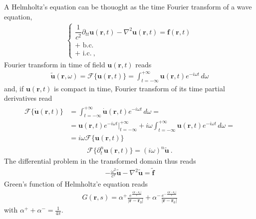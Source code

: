 \documentclass[letterpaper,10pt,italian]{jupyterBook}
\begin{document}
\sphinxAtStartPar
A Helmholtz’s equation can be thouoght as the time Fourier transform of a wave equation,
\begin{equation*}
\begin{split}\begin{cases}
  \dfrac{1}{c^2} \partial_{tt} \mathbf{u}(\mathbf{r},t) - \nabla^2 \mathbf{u}(\mathbf{r},t) = \mathbf{f}(\mathbf{r},t) \\
  \text{+ b.c.} \\
  \text{+ i.c.} \ ,
\end{cases}\end{split}
\end{equation*}
\sphinxAtStartPar
Fourier transform in time of field \(\mathbf{u}(\mathbf{r},t)\) reads
\begin{equation*}
\begin{split}\tilde{\mathbf{u}}(\mathbf{r}, \omega) = \mathscr{F}\{ \mathbf{u}(\mathbf{r},t) \} = \int_{t=-\infty}^{+\infty} \mathbf{u}(\mathbf{r},t) e^{-i \omega t} \, d \omega\end{split}
\end{equation*}
\sphinxAtStartPar
and, if \(\mathbf{u}(\mathbf{r},t)\) is compact in time, Fourier transform of its time partial derivatives read
\begin{equation*}
\begin{split}\begin{aligned}
  \mathscr{F}\{ \dot{\mathbf{u}}(\mathbf{r},t) \} 
  & = \int_{t=-\infty}^{+\infty} \dot{\mathbf{u}}(\mathbf{r},t) e^{-i \omega t} \, d \omega = \\
  & = \mathbf{u}(\mathbf{r},t) e^{-i \omega t} \big|_{t=-\infty}^{+\infty} + i \omega \int_{t=-\infty}^{+\infty} \mathbf{u}(\mathbf{r},t) e^{-i \omega t} \, d \omega = \\
  & = i \omega \mathscr{F}\{  \mathbf{u}(\mathbf{r},t) \}
\end{aligned}\end{split}
\end{equation*}\begin{equation*}
\begin{split}\mathscr{F}\{ \partial_t^n \mathbf{u}(\mathbf{r},t) \} = (i \omega)^n \tilde{\mathbf{u}} \ .\end{split}
\end{equation*}
\sphinxAtStartPar
The differential problem in the transformed domain thus reads
\begin{equation*}
\begin{split}- \frac{\omega^2}{c^2} \tilde{\mathbf{u}} - \nabla^2 \tilde{\mathbf{u}} = \tilde{\mathbf{f}}\end{split}
\end{equation*}
\sphinxAtStartPar
Green’s function of Helmholtz’e equation reads
\begin{equation*}
\begin{split}G(\mathbf{r}, s) =
  \alpha^+ \frac{e^{ \frac{s|\mathbf{r} - \mathbf{r}_0|}{c}}}{|\mathbf{r} - \mathbf{r}_0|} +
  \alpha^- \frac{e^{-\frac{s|\mathbf{r} - \mathbf{r}_0|}{c}}}{|\mathbf{r} - \mathbf{r}_0|}
\end{split}
\end{equation*}
\sphinxAtStartPar
with \(\alpha^+ + \alpha^- = \frac{1}{4 \pi}\).
\end{document}

